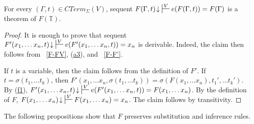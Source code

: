 \documentclass[reqno]{amsart}
\newcommand{\axref}[1]{(\hyperref[ax:#1]{#1})}
\theoremstyle{definition}
\theoremstyle{remark}
\numberwithin{figure}{section}
\begin{document}
\begin{lem}[F-e]
For every $(\Gamma,t) \in CTerm_\Sigma(V)$, sequent $F(\Gamma,t)\!\downarrow\ \sststile{}{V} e(F(\Gamma,t)) = F(\Gamma)$ is a theorem of $F(\mathbb{T})$.
\end{lem}
\begin{proof}
It is enough to prove that sequent $F'(x_1, \ldots x_n, t)\!\downarrow\ \sststile{}{V} e(F'(x_1, \ldots x_n, t)) = x_n$ is derivable.
Indeed, the claim then follows from ~\eqref{F-FV}, \axref{a3}, and ~\eqref{F-F'}.

If $t$ is a variable, then the claim follows from the definition of $F'$.
If $t = \sigma(t_1, \ldots t_k)$, then $F'(x_1, \ldots x_n, \sigma(t_1, \ldots t_k)) = \sigma(F(x_1, \ldots x_n), t_1', \ldots t_k')$.
By \axref{f1}, $F'(x_1, \ldots x_n, t)\!\downarrow\ \sststile{}{V} e(F'(x_1, \ldots x_n, t)) = F(x_1, \ldots x_n)$.
By the definition of $F$, $F(x_1, \ldots x_n)\!\downarrow\ \sststile{}{V} F(x_1, \ldots x_n) = x_n$.
The claim follows by transitivity.
\end{proof}

The following propositions show that $F$ preserves substitution and inference rules.
\end{document}
